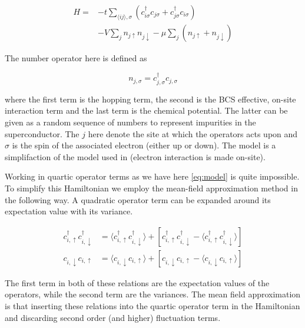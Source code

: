 \documentclass[11pt]{article}
\begin{document}
\begin{align}\label{eq:model}
	H = &-t \sum_{\langle i j\rangle, \sigma}\left(c_{i \sigma}^{\dagger} c_{j \sigma} + c_{j \sigma}^{\dagger} c_{i \sigma}\right) \nonumber \\ 
	    &- V \sum_j n_{j \uparrow} n_{j \downarrow} -\mu \sum_j\left(n_{j \uparrow}+n_{j \downarrow}\right) 
\end{align}

The number operator here is defined as

\begin{equation}
	n_{j, \sigma} = c_{j, \sigma}^\dagger c_{j, \sigma}
\end{equation}

where the first term is the hopping term, the second is the BCS effective, on-site interaction term and the last term is the chemical potential. The latter can be given as a random sequence of numbers to represent impurities in the superconductor. %
The $j$ here denote the site at which the operators acts upon and $\sigma$ is the spin of the associated electron (either up or down). The model is a simplifaction of the model used in \cite{zhangChiralPwaveSuperconducting2019} (electron interaction is made on-site). 

Working in quartic operator terms as we have here \eqref{eq:model} is quite impossible. To simplify this Hamiltonian we employ the mean-field approximation method in the following way. A quadratic operator term can be expanded around its expectation value with its variance. 

\begin{align}
 c_{i, \uparrow}^{\dagger}c_{i, \downarrow}^{\dagger} &= \langle c_{i, \uparrow}^{\dagger}c_{i, \downarrow}^{\dagger} \rangle + [c_{i, \uparrow}^{\dagger}c_{i, \downarrow}^{\dagger} - \langle c_{i, \uparrow}^{\dagger}c_{i, \downarrow}^{\dagger} \rangle] \\ 
 c_{i, \downarrow}c_{i, \uparrow} &= \langle c_{i, \downarrow}c_{i, \uparrow} \rangle + [c_{i, \downarrow}c_{i, \uparrow} - \langle c_{i, \downarrow}c_{i, \uparrow} \rangle]
\end{align}

The first term in both of these relations are the expectation values of the operators, while the second term are the variances. The mean field approximation is that inserting these relations into the quartic operator term in the Hamiltonian and discarding second order (and higher) fluctuation terms. 
\end{document}
